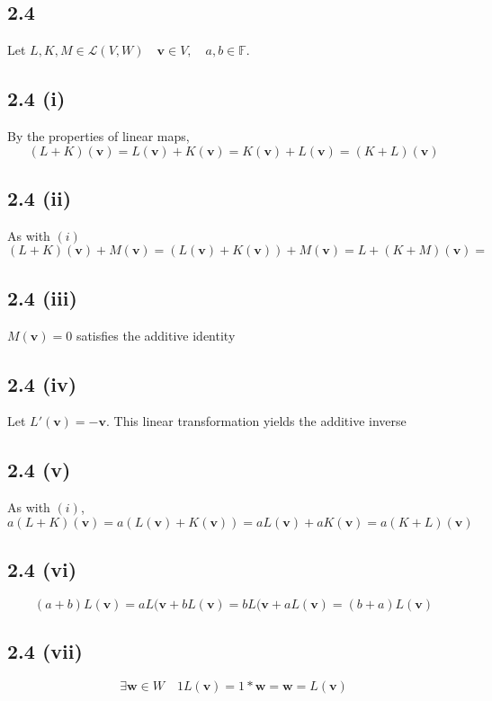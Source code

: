 \documentclass[letterpaper,12pt]{article}
\theoremstyle{definition}
\begin{document}
\subsection*{2.4}
Let $L,K,M \in \mathscr{L}(V,W) \quad \mathbf{v} \in V, \quad a,b \in \mathbb{F} $.
\subsection*{2.4 (i)}
By the properties of linear maps,
\[(L+K)(\mathbf{v} ) = L(\mathbf{v} ) + K(\mathbf{v} ) = K(\mathbf{v} ) + L(\mathbf{v} ) = (K+L)(\mathbf{v} ) \]

\subsection*{2.4 (ii)}
As with $(i)$
\[(L+K)(\mathbf{v} ) + M(\mathbf{v} ) = (L(\mathbf{v} ) + K(\mathbf{v} )) + M(\mathbf{v} ) = L + (K + M)(\mathbf{v} ) = \]


\subsection*{2.4 (iii)}
$M(\mathbf{v} ) = 0$ satisfies the additive identity

\subsection*{2.4 (iv)}
Let $L'(\mathbf{v} ) = -\mathbf{v}$. This linear transformation yields the additive inverse

\subsection*{2.4 (v)}
As with $(i)$,
\[a(L+K)(\mathbf{v} ) = a(L(\mathbf{v} ) + K(\mathbf{v} )) = aL(\mathbf{v} ) + aK(\mathbf{v} ) = a(K+L)(\mathbf{v} )\]

\subsection*{2.4 (vi)}

\[(a+b)L(\mathbf{v} ) = aL(\mathbf{v} + bL(\mathbf{v} ) = bL(\mathbf{v} + aL(\mathbf{v})= (b+a)L(\mathbf{v})\]

\subsection*{2.4 (vii)}
\[ \exists \mathbf{w} \in W  \quad 1L(\mathbf{v} ) = 1 * \mathbf{w} = \mathbf{w} = L(\mathbf{v} )\]
\end{document}
